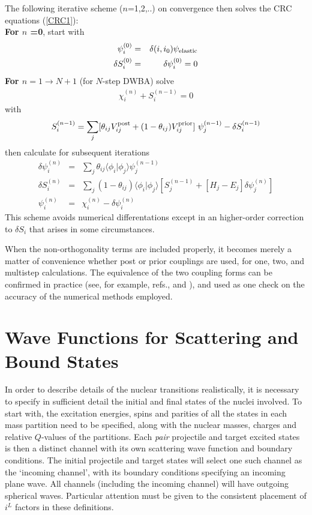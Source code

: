 \documentclass[11pt,a4paper]{article}
\begin{document}
The following iterative scheme
\cite{OSAKA}
($n$=1,2,..) on convergence then solves the CRC equations (\ref{CRC1}):\\

{\bf For $n$ =0}, start with
\begin{eqnarray}
\psi_i^{(0)} & = &\delta(i,i_0)\psi_{\rm elastic}
\\
  \delta S_i^{(0)} & = &\delta\psi_i^{(0)} = 0
\end{eqnarray}
{\bf For $n =1\rightarrow N+1$} (for $N$-step DWBA) solve
\begin{eqnarray}
 [ H_i - E_i ] \chi_i^{(n)} + S_i^{(n-1)} = 0
\end{eqnarray}
with
\begin{eqnarray}
S_i^{(n-1)} = \sum _ j
   [ \theta_{ij} V_{ij}^{\rm post} + (1 - \theta_{ij} ) V_{ij}^{\rm prior} ] ~
        \psi_j^{(n-1)} - \delta S_i^{(n-1)}
\end{eqnarray}
then calculate for subsequent iterations
\begin{eqnarray}
 \delta\psi_i^{(n)} &=& \sum _ j  \theta_{ij}
                            \langle\phi_i |\phi_j\rangle\psi_j^{(n-1)}
\\
 \delta  S _i^{(n)} &=& \sum _ j  (1-\theta_{ij})
                            \langle\phi_i |\phi_j\rangle
                    [ S_j^{(n-1)} + [H_j - E_j ] \delta\psi_j^{(n)} ]
\\
\psi_i^{(n)} &=& \chi_i^{(n)} - \delta\psi_i^{(n)}
\end{eqnarray}
This scheme avoids numerical differentations except in an higher-order
correction to $\delta S_i $ that arises in some circumstances.

When the non-orthogonality terms are included properly, it becomes merely
a matter of convenience whether post or prior couplings are used,
for one, two, and multistep calculations.
The equivalence of the two coupling forms can be confirmed in practice
(see, for example, refs.\cite{OSAKA}, and \cite{lill83}),
and used as one check on the accuracy of the numerical methods employed.
\section{Wave Functions for Scattering and Bound States}

In order to describe details of the nuclear transitions realistically,
it is necessary to specify in sufficient detail the initial and final
states of the nuclei involved. To start with, the excitation energies,
spins and parities of all the states in each mass partition need to be
specified, along with the nuclear masses, charges and relative
$Q$-values of the partitions.  Each {\em pair} projectile and target
excited states is then a distinct channel with its own scattering wave
function and boundary conditions. The initial projectile and target states
will select one such channel as the `incoming channel', with its
boundary conditions specifying an incoming plane wave. All channels
(including the incoming channel) will have outgoing spherical waves.
Particular attention must be given to the consistent
placement of $ i^L $ factors in these definitions.
\end{document}
